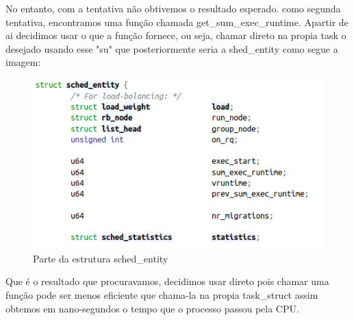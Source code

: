 \documentclass[12pt]{article}
\begin{document}
	No entanto, com a tentativa não obtivemos o resultado esperado.
como segunda tentativa, encontramos uma função chamada get\_sum\_exec\_runtime. Apartir de ai decidimos usar o que a função fornece, ou seja, chamar direto na propia task o desejado usando esse "su" que posteriormente seria a shed\_entity como segue a imagem:
 
\begin{figure}[!htb]
	\centering
	\includegraphics[scale=0.6]{imagens/img2.png}
	\caption{Parte da estrutura sched\_entity}
	\label{schedentity}
\end{figure}

	Que é o resultado que procuravamos, decidimos usar direto pois chamar uma função pode ser menos eficiente que chama-la na propia task\_struct assim obtemos em nano-segundos o tempo que o processo passou pela CPU.
\end{document}
